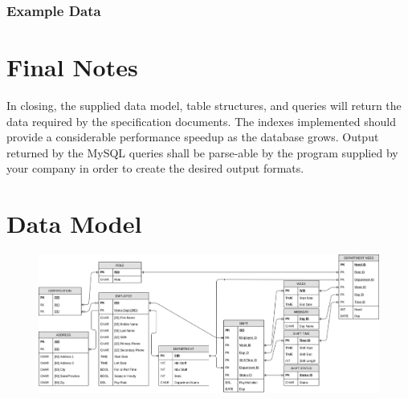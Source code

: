 \documentclass[letter,12pt]{texMemo}
\begin{document}
\subsubsection*{Example Data}
\lstset{style=smallstyle}
	\begin{center}
		
	\end{center}
\lstset{style=smallstyle}

\section*{Final Notes}
In closing, the supplied data model, table structures, and queries will return the data required by the specification documents. The indexes implemented should provide a considerable performance speedup as the database grows. Output returned by the MySQL queries shall be parse-able by the program supplied by your company in order to create the desired output formats.

\newpage
\section*{Data Model}
\begin{figure}[H]
	\centering
	\includegraphics[angle=90, height=\textheight]{er_diag.png}
\end{figure}



%
%
\end{document}
